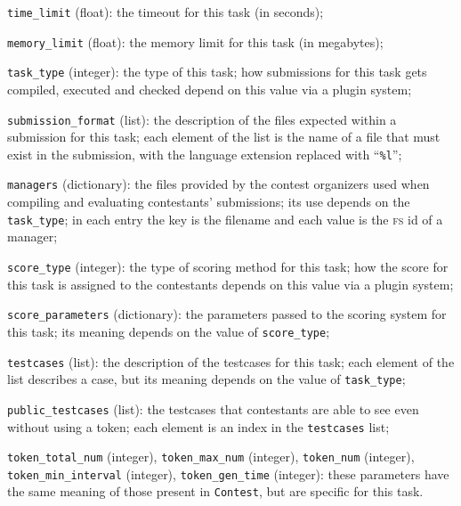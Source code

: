 \documentclass[a4paper,8pt]{amsart}
\newcommand{\FS}{\textsc{fs}}
\newenvironment{squishlist}{%
  \begin{list}{\textbullet}%
    { \setlength{\itemsep}{0pt}%
      \setlength{\parsep}{3pt}%
      \setlength{\topsep}{3pt}%
      \setlength{\partopsep}{0pt}%
      \setlength{\leftmargin}{1.5em}%
      \setlength{\labelwidth}{1em}%
      \setlength{\labelsep}{0.5em} }%
}{\end{list}}
\newcommand{\id}[1]{\texttt{#1}}
\begin{document}
\begin{multicols}{2}
\begin{squishlist}
  \item \id{time\_limit} (float): the timeout for this task (in
    seconds);

  \item \id{memory\_limit} (float): the memory limit for this task (in
    megabytes);

  \item \id{task\_type} (integer): the type of this task; how
    submissions for this task gets compiled, executed and checked
    depend on this value via a plugin system;

  \item \id{submission\_format} (list): the description of the files
    expected within a submission for this task; each element of the
    list is the name of a file that must exist in the submission, with
    the language extension replaced with ``\texttt{\%l}'';

  \item \id{managers} (dictionary): the files provided by the contest
    organizers used when compiling and evaluating contestants'
    submissions; its use depends on the \id{task\_type}; in each entry
    the key is the filename and each value is the \FS{} id of a
    manager;

  \item \id{score\_type} (integer): the type of scoring method for
    this task; how the score for this task is assigned to the
    contestants depends on this value via a plugin system;

  \item \id{score\_parameters} (dictionary): the parameters passed to
    the scoring system for this task; its meaning depends on the value
    of \id{score\_type};

  \item \id{testcases} (list): the description of the testcases for
    this task; each element of the list describes a case, but its
    meaning depends on the value of \id{task\_type};

  \item \id{public\_testcases} (list): the testcases that contestants
    are able to see even without using a token; each element is an
    index in the \id{testcases} list;

  \item \id{token\_total\_num} (integer), \id{token\_max\_num}
    (integer), \id{token\_num} (integer), \id{token\_min\_interval}
    (integer), \id{token\_gen\_time} (integer): these parameters have
    the same meaning of those present in \id{Contest}, but are
    specific for this task.


\end{squishlist}
\end{multicols}
\end{document}
